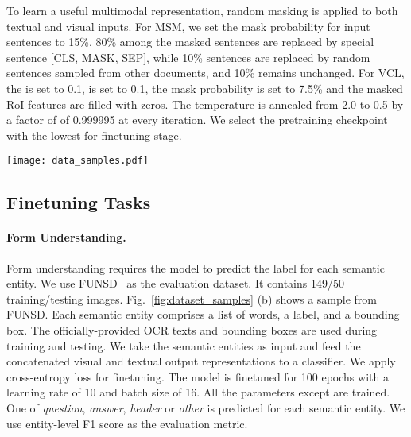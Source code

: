 \documentclass{article}
\begin{document}
	
	To {learn {a} useful} multimodal representation, {random} masking {is applied to both textual and visual inputs}. {For} MSM, we set the mask probability  for input sentences to 15\%. 80\% among the masked sentences are replaced by special sentence [CLS, MASK, SEP], {while} 10\% sentences are replaced by random sentence{s} sampled from other documents, and 10\% remains {unchanged}. {For} VCL, {the  is set to 0.1,  is set to 0.1}, the mask probability  is set to 7.5\% {and the masked} RoI features are {filled} with zeros. {The temperature  is annealed from 2.0 to 0.5 by a factor of of 0.999995 at every iteration.} {We select the pretraining checkpoint with the lowest  for finetuning stage}.
	
	\begin{figure*}[t!]
		\vspace{-1mm}
		\begin{center}
			\texttt{[image: data\_samples.pdf]}
		\end{center}
		\vspace{-4mm}
		\caption{{Document image samples. The boxes in red/green are OCR bounding boxes {obtained} with/without paragraph mode, {while the} boxes in blue are officially-provided bounding boxes}.}
		\vspace{-4mm}
		\label{fig:dataset_samples}
	\end{figure*}
	
	\subsection{Finetuning Tasks}
	\paragraph{Form Understanding.}
	Form understanding requires the model to predict the label for each semantic entity. We use FUNSD~\cite{8892998} as the evaluation dataset. It contains 149/50 training/testing images. Fig.~\ref{fig:dataset_samples} (b) shows {a sample} from FUNSD. Each semantic entity comprises a list of words, a label, and a bounding box. {The officially-provided OCR texts and bounding boxes} are used during training and testing. We take the semantic entities as input and feed the concatenated visual and textual output representation{s} to a classifier. We apply cross-entropy loss {for finetuning}. The model is finetuned for 100 epochs with a learning rate of 10 and batch size of 16. All the parameters except  are {trained}. {One of} \textit{question}, \textit{answer}, \textit{header} or \textit{other} {is} {predicted} for each semantic entity. We use entity-level F1 score as the evaluation metric.
	
\end{document}
